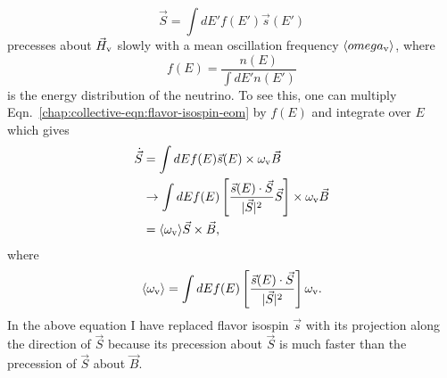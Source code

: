 \begin{equation}
    \vec S = \int d E' f(E') \vec s(E') 
\end{equation}
precesses about $\vec H_\mathrm v$ slowly with a mean oscillation frequency $\langle omega_\mathrm v \rangle$, where
\begin{equation}
    f(E) = \frac{ n(E) }{ \int dE' n(E') }
\end{equation}
is the energy distribution of the neutrino. To see this, one can multiply Eqn.~\ref{chap:collective-eqn:flavor-isospin-eom} by $f(E)$ and integrate over $E$ which gives
\begin{align}
    \dot{\vec S} &= \int dE f(E)\vec s(E) \times \omega_\mathrm v \vec B \\
    &\to \int dE f(E) \left[ \frac{\vec s(E) \cdot \vec S}{ \lvert \vec S \rvert^2 } \vec S \right] \times \omega_\mathrm v \vec B \\
    &= \langle \omega_\mathrm v \rangle \vec S \times \vec B,
\end{align}
where
\begin{equation}
    \langle \omega_\mathrm v \rangle  = \int dE f(E) \left[ \frac{\vec s(E) \cdot \vec S}{ \lvert \vec S \rvert^2 } \right] \omega_\mathrm v.
\end{equation}
In the above equation I have replaced flavor isospin $\vec s$ with its projection along the direction of $\vec S$ because its precession about $\vec S$ is much faster than the precession of $\vec S$ about $\vec B$.


